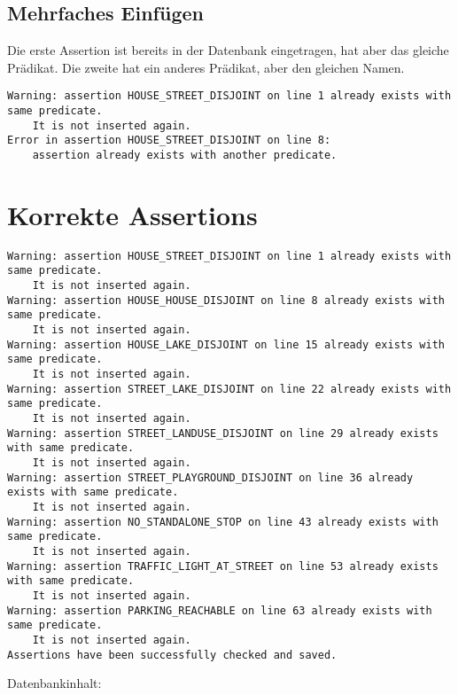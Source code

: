 \documentclass[a4paper]{article}
\begin{document}
\subsection{Mehrfaches Einfügen}

Die erste Assertion ist bereits in der Datenbank eingetragen, hat
aber das gleiche Prädikat. Die zweite hat ein anderes Prädikat, aber den gleichen
Namen.


\begin{verbatim}
Warning: assertion HOUSE_STREET_DISJOINT on line 1 already exists with same predicate.
    It is not inserted again.
Error in assertion HOUSE_STREET_DISJOINT on line 8: 
    assertion already exists with another predicate.
\end{verbatim}

\section{Korrekte Assertions}


\begin{verbatim}
Warning: assertion HOUSE_STREET_DISJOINT on line 1 already exists with same predicate.
    It is not inserted again.
Warning: assertion HOUSE_HOUSE_DISJOINT on line 8 already exists with same predicate.
    It is not inserted again.
Warning: assertion HOUSE_LAKE_DISJOINT on line 15 already exists with same predicate.
    It is not inserted again.
Warning: assertion STREET_LAKE_DISJOINT on line 22 already exists with same predicate.
    It is not inserted again.
Warning: assertion STREET_LANDUSE_DISJOINT on line 29 already exists with same predicate.
    It is not inserted again.
Warning: assertion STREET_PLAYGROUND_DISJOINT on line 36 already exists with same predicate.
    It is not inserted again.
Warning: assertion NO_STANDALONE_STOP on line 43 already exists with same predicate.
    It is not inserted again.
Warning: assertion TRAFFIC_LIGHT_AT_STREET on line 53 already exists with same predicate.
    It is not inserted again.
Warning: assertion PARKING_REACHABLE on line 63 already exists with same predicate.
    It is not inserted again.
Assertions have been successfully checked and saved.
\end{verbatim}

Datenbankinhalt:
\end{document}
